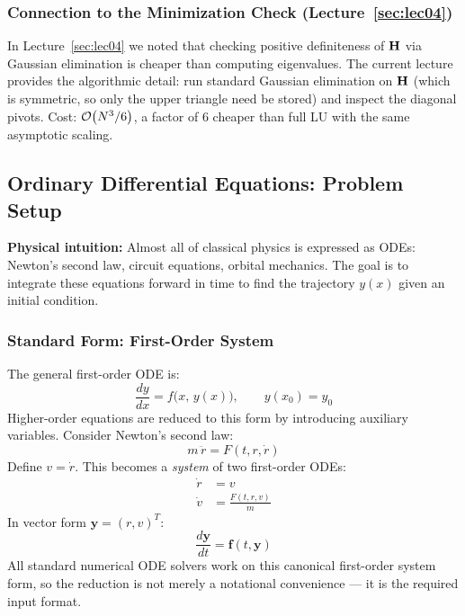 \subsubsection{Connection to the Minimization Check (Lecture~\ref{sec:lec04})}
In Lecture~\ref{sec:lec04} we noted that checking positive definiteness of
$\mathbf{H}$ via Gaussian elimination is cheaper than computing eigenvalues. The
current lecture provides the algorithmic detail: run standard Gaussian
elimination on $\mathbf{H}$ (which is symmetric, so only the upper triangle need
be stored) and inspect the diagonal pivots. Cost: $\mathcal{O}\!\left(N^3/6\right)$, a factor of
6 cheaper than full LU with the same asymptotic scaling.

\subsection{Ordinary Differential Equations: Problem Setup}

\noindent\textbf{Physical intuition:} Almost all of classical physics is
expressed as ODEs: Newton's second law, circuit equations, orbital mechanics.
The goal is to integrate these equations forward in time to find the
trajectory $y(x)$ given an initial condition.

\subsubsection{Standard Form: First-Order System}
The general first-order ODE is:
\begin{equation}
\frac{dy}{dx} = f\bigl(x,\, y(x)\bigr), \qquad y(x_0) = y_0
\end{equation}
Higher-order equations are reduced to this form by introducing auxiliary
variables. Consider Newton's second law:
\begin{equation}
m\,\ddot{r} = F(t, r, \dot{r})
\end{equation}
Define $v = \dot{r}$. This becomes a \emph{system} of two first-order ODEs:
\begin{align}
\dot{r} &= v \\
\dot{v} &= \frac{F(t, r, v)}{m}
\end{align}
In vector form $\mathbf{y} = (r, v)^T$:
\begin{equation}
\frac{d\mathbf{y}}{dt} = \mathbf{f}(t, \mathbf{y})
\end{equation}
All standard numerical ODE solvers work on this canonical first-order system
form, so the reduction is not merely a notational convenience — it is the
required input format.

